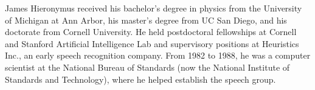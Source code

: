 \documentclass[journal]{IEEEtran}
\begin{document}
\begin{IEEEbiography}%
{James Hieronymus} received his bachelor’s degree in physics from the University of Michigan at Ann Arbor, his master’s degree from UC San Diego, and his doctorate from Cornell University.
He held postdoctoral fellowships at Cornell and Stanford Artificial Intelligence Lab and supervisory positions at Heuristics Inc., an early speech recognition company. From 1982 to 1988, he was a computer scientist at the National Bureau of Standards (now the National Institute of Standards and Technology), where he helped establish the speech group.
\end{IEEEbiography}









\end{document}
